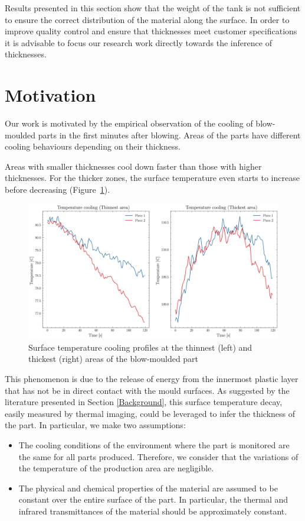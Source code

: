 %
Results presented in this section show that the weight of the tank is not sufficient to ensure the correct distribution of the material along the surface. In order to improve quality control and ensure that thicknesses meet customer specifications it is advisable to focus our research work directly towards the inference of thicknesses.

\section{Motivation} \label{Motivation}

Our work is motivated by the empirical observation of the cooling of blow-moulded parts in the first minutes after blowing. Areas of the parts have different cooling behaviours depending on their thickness. 

Areas with smaller thicknesses cool down faster than those with higher thicknesses. For the thicker zones, the surface temperature even starts to increase before decreasing (Figure~\ref{fig:temperature_cooling}).
%
\begin{figure}
\centering
\includegraphics[scale=0.55]{images/chapter_4/cooling.eps}
\caption{Surface temperature cooling profiles at the thinnest (left) and thickest (right) areas of the blow-moulded part}
\label{fig:temperature_cooling}
\end{figure}
%
This phenomenon is due to the release of energy from the innermost plastic layer that has not be in direct contact with the mould surfaces.
As suggested by the literature presented in Section \ref{Background}, this surface temperature decay, easily measured by thermal imaging, could be leveraged to infer the thickness of the part.  
In particular, we make two assumptions:
\begin{itemize}
   \item The cooling conditions of the environment where the part is monitored are the same for all parts produced. Therefore, we consider that the variations of the temperature of the production area are negligible.
   \item The physical and chemical properties of the material are assumed to be constant over the entire surface of the part. In particular, the thermal and infrared transmittances of the material should be approximately constant.
\end{itemize}


